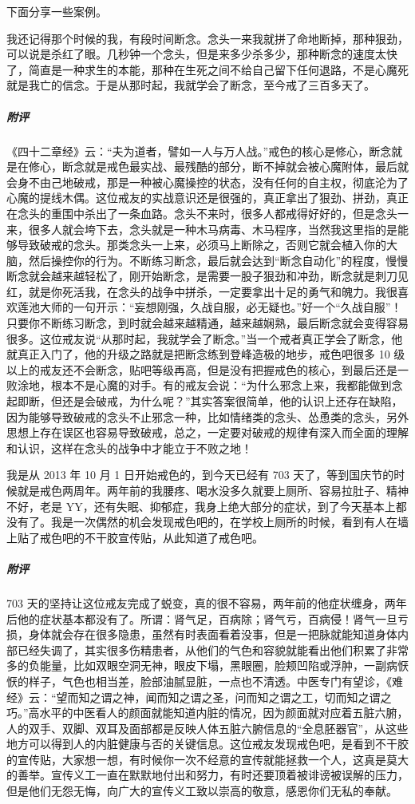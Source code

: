 下面分享一些案例。

\begin{case}
    我还记得那个时候的我，有段时间断念。念头一来我就拼了命地断掉，那种狠劲，可以说是杀红了眼。几秒钟一个念头，但是来多少杀多少，那种断念的速度太快了，简直是一种求生的本能，那种在生死之间不给自己留下任何退路，不是心魔死就是我亡的信念。于是从那时起，我就学会了断念，至今戒了三百多天了。
    \subparagraph{附评} 《四十二章经》云：“夫为道者，譬如一人与万人战。”戒色的核心是修心，断念就是在修心，断念就是戒色最实战、最残酷的部分，断不掉就会被心魔附体，最后就会身不由己地破戒，那是一种被心魔操控的状态，没有任何的自主权，彻底沦为了心魔的提线木偶。这位戒友的实战意识还是很强的，真正拿出了狠劲、拼劲，真正在念头的重围中杀出了一条血路。念头不来时，很多人都戒得好好的，但是念头一来，很多人就会垮下去，念头就是一种木马病毒、木马程序，当然我这里指的是能够导致破戒的念头。那类念头一上来，必须马上断除之，否则它就会植入你的大脑，然后操控你的行为。不断练习断念，最后就会达到“断念自动化”的程度，慢慢断念就会越来越轻松了，刚开始断念，是需要一股子狠劲和冲劲，断念就是刺刀见红，就是你死活我，在念头的战争中拼杀，一定要拿出十足的勇气和魄力。我很喜欢莲池大师的一句开示：“妄想刚强，久战自服，必无疑也。”好一个“久战自服”！只要你不断练习断念，到时就会越来越精通，越来越娴熟，最后断念就会变得容易很多。这位戒友说“从那时起，我就学会了断念。”当一个戒者真正学会了断念，他就真正入门了，他的升级之路就是把断念练到登峰造极的地步，戒色吧很多 10 级以上的戒友还不会断念，贴吧等级再高，但是没有把握戒色的核心，到最后还是一败涂地，根本不是心魔的对手。有的戒友会说：“为什么邪念上来，我都能做到念起即断，但还是会破戒，为什么呢？”其实答案很简单，他的认识上还存在缺陷，因为能够导致破戒的念头不止邪念一种，比如情绪类的念头、怂恿类的念头，另外思想上存在误区也容易导致破戒，总之，一定要对破戒的规律有深入而全面的理解和认识，这样在念头的战争中才能立于不败之地！
\end{case}

\begin{case}
    我是从 2013 年 10 月 1 日开始戒色的，到今天已经有 703 天了，等到国庆节的时候就是戒色两周年。两年前的我腰疼、喝水没多久就要上厕所、容易拉肚子、精神不好，老是 YY，还有失眠、抑郁症，我身上绝大部分的症状，到了今天基本上都没有了。我是一次偶然的机会发现戒色吧的，在学校上厕所的时候，看到有人在墙上贴了戒色吧的不干胶宣传贴，从此知道了戒色吧。
    \subparagraph{附评} 703 天的坚持让这位戒友完成了蜕变，真的很不容易，两年前的他症状缠身，两年后他的症状基本都没有了。所谓：肾气足，百病除；肾气亏，百病侵！肾气一旦亏损，身体就会存在很多隐患，虽然有时表面看着没事，但是一把脉就能知道身体内部已经失调了，其实很多伤精患者，从他们的气色和容貌就能看出他们积累了非常多的负能量，比如双眼空洞无神，眼皮下塌，黑眼圈，脸颊凹陷或浮肿，一副病恹恹的样子，气色也相当差，脸部油腻显脏，一点也不清透。中医专门有望诊，《难经》云：“望而知之谓之神，闻而知之谓之圣，问而知之谓之工，切而知之谓之巧。”高水平的中医看人的颜面就能知道内脏的情况，因为颜面就对应着五脏六腑，人的双手、双脚、双耳及面部都是反映人体五脏六腑信息的“全息胚器官”，从这些地方可以得到人的内脏健康与否的关键信息。这位戒友发现戒色吧，是看到不干胶的宣传贴，大家想一想，有时候你一次不经意的宣传就能拯救一个人，这真是莫大的善举。宣传义工一直在默默地付出和努力，有时还要顶着被诽谤被误解的压力，但是他们无怨无悔，向广大的宣传义工致以崇高的敬意，感恩你们无私的奉献。
\end{case}

